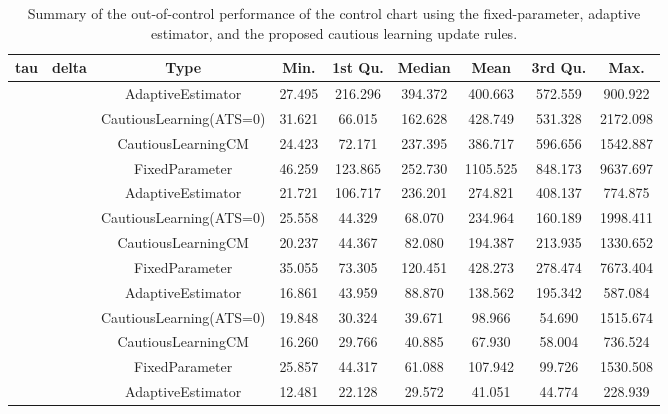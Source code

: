 \begin{table}[!h]

\caption{Summary of the out-of-control performance of the control chart using the fixed-parameter, adaptive estimator, and the proposed cautious learning update rules.}
\centering
\begin{tabular}[t]{ccccccccc}
\toprule
tau & delta & Type & Min. & 1st Qu. & Median & Mean & 3rd Qu. & Max.\\
\midrule
 &  & AdaptiveEstimator & 27.495 & 216.296 & 394.372 & 400.663 & 572.559 & 900.922\\

 &  & CautiousLearning(ATS=0) & 31.621 & 66.015 & 162.628 & 428.749 & 531.328 & 2172.098\\

 &  & CautiousLearningCM & 24.423 & 72.171 & 237.395 & 386.717 & 596.656 & 1542.887\\

 & \multirow[t]{-4}{*}{\centering\arraybackslash 0.25} & FixedParameter & 46.259 & 123.865 & 252.730 & 1105.525 & 848.173 & 9637.697\\
\cmidrule{2-9}
 &  & AdaptiveEstimator & 21.721 & 106.717 & 236.201 & 274.821 & 408.137 & 774.875\\

 &  & CautiousLearning(ATS=0) & 25.558 & 44.329 & 68.070 & 234.964 & 160.189 & 1998.411\\

 &  & CautiousLearningCM & 20.237 & 44.367 & 82.080 & 194.387 & 213.935 & 1330.652\\

 & \multirow[t]{-4}{*}{\centering\arraybackslash 0.35} & FixedParameter & 35.055 & 73.305 & 120.451 & 428.273 & 278.474 & 7673.404\\
\cmidrule{2-9}
 &  & AdaptiveEstimator & 16.861 & 43.959 & 88.870 & 138.562 & 195.342 & 587.084\\

 &  & CautiousLearning(ATS=0) & 19.848 & 30.324 & 39.671 & 98.966 & 54.690 & 1515.674\\

 &  & CautiousLearningCM & 16.260 & 29.766 & 40.885 & 67.930 & 58.004 & 736.524\\

 & \multirow[t]{-4}{*}{\centering\arraybackslash 0.50} & FixedParameter & 25.857 & 44.317 & 61.088 & 107.942 & 99.726 & 1530.508\\
\cmidrule{2-9}
 &  & AdaptiveEstimator & 12.481 & 22.128 & 29.572 & 41.051 & 44.774 & 228.939\\


\end{tabular}
\end{table}
